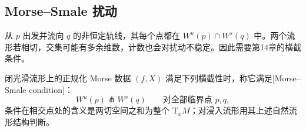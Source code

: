 \subsection{Morse–Smale 扰动}
\label{g2:subsec:1801:03}

从 \(p\) 出发并流向 \(q\) 的非恒定轨线，其每个点都在 \(W^u(p)\cap W^s(q)\) 中。两个流形若相切，交集可能有多余维数，计数也会对扰动不稳定。因此需要第14章的横截条件。

\begin{definition}\label{g2:def:morse-smale-data}
	闭光滑流形上的正规化 Morse 数据 \((f,X)\) 满足下列横截性时，称它满足[Morse--Smale condition]：
	\[
		W^u(p)\pitchfork W^s(q)\qquad
		\text{对全部临界点 }p,q,
	\]
	条件在相交点处的含义是两切空间之和为整个 \(\mathrm T_xM\)；对浸入流形用其上述自然流形结构判断。
\end{definition}


